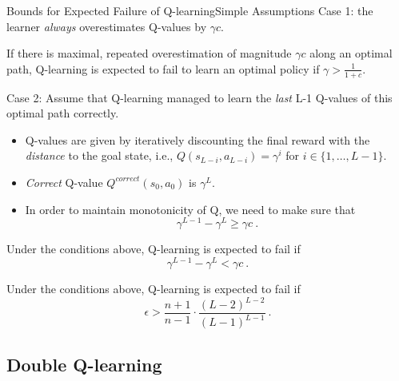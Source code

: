 \documentclass{beamer}
\begin{document}
\begin{frame}{Bounds for Expected Failure of Q-learning}{Simple Assumptions}
Case 1: the learner \textit{always} overestimates Q-values by $\gamma c$.
\begin{Theorem}
	If there is maximal, repeated overestimation of magnitude $\gamma c$ along an optimal path, Q-learning is expected to fail to learn an optimal policy if $\gamma > \frac{1}{1+c}$.
\end{Theorem}
\end{frame}

\begin{frame}
Case 2: Assume that Q-learning managed to learn the \textit{last} L-1 Q-values of this optimal path correctly.

\begin{itemize}
	\item Q-values are given by iteratively discounting the final reward with the \textit{distance} to the goal state, i.e., $Q(s_{L-i}, a_{L-i}) = \gamma^i$ for $i \in \{1,\ldots,L-1\}$.
	\item \textit{Correct} Q-value $Q^{correct}(s_0, a_0)$ is $\gamma^L$.
	
	\item In order to maintain monotonicity of Q, we need to make sure that
	\begin{equation}
	\gamma^{L-1} - \gamma^L \geq \gamma c ~.
	\end{equation}
\end{itemize}
\begin{theorem}
	Under the conditions above, Q-learning is expected to fail if
	\begin{equation}
		\gamma^{L-1} - \gamma^L < \gamma c ~.
	\end{equation}
\end{theorem}
\end{frame}

\begin{frame}
	\begin{theorem}
		Under the conditions above, Q-learning is expected to fail if
		\begin{equation}
			\epsilon > \frac{n+1}{n-1}\cdot \frac{(L-2)^{L-2}}{(L-1)^{L-1}} ~.
		\end{equation}
	\end{theorem}
\end{frame}

\subsection{Double Q-learning}
\end{document}
